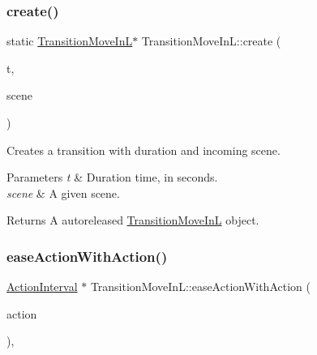 \subsubsection{\texorpdfstring{create()}{create()}\hspace{0.1cm}{\footnotesize\ttfamily [2/2]}}
{\footnotesize\ttfamily static \hyperlink{classTransitionMoveInL}{Transition\+Move\+InL}$\ast$ Transition\+Move\+In\+L\+::create (\begin{DoxyParamCaption}\item[{float}]{t,  }\item[{\hyperlink{classScene}{Scene} $\ast$}]{scene }\end{DoxyParamCaption})\hspace{0.3cm}{\ttfamily [static]}}

Creates a transition with duration and incoming scene.


\begin{DoxyParams}{Parameters}
{\em t} & Duration time, in seconds. \\
\hline
{\em scene} & A given scene. \\
\hline
\end{DoxyParams}
\begin{DoxyReturn}{Returns}
A autoreleased \hyperlink{classTransitionMoveInL}{Transition\+Move\+InL} object. 
\end{DoxyReturn}
\mbox{\label{classTransitionMoveInL_ab9e3308035155049f79a074ade4de8a1}} 
\subsubsection{\texorpdfstring{ease\+Action\+With\+Action()}{easeActionWithAction()}\hspace{0.1cm}{\footnotesize\ttfamily [1/2]}}
{\footnotesize\ttfamily \hyperlink{classActionInterval}{Action\+Interval} $\ast$ Transition\+Move\+In\+L\+::ease\+Action\+With\+Action (\begin{DoxyParamCaption}\item[{\hyperlink{classActionInterval}{Action\+Interval} $\ast$}]{action }\end{DoxyParamCaption})\hspace{0.3cm}{\ttfamily [override]}, {\ttfamily [virtual]}}

